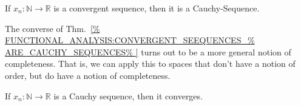 \documentclass[crop=false,class=article,oneside]{standalone}
\begin{document}
            \begin{theorem}
                \label{%
                    FUNCTIONAL_ANALYSIS:CONVERGENT_SEEQUENCES_%
                    ARE_CAUCHY_SEQUENCES%
                }
                If $x_{n}:\mathbb{N}\rightarrow\mathbb{R}$ is a 
                convergent sequence, then it is a Cauchy-Sequence.
            \end{theorem}
            The converse of Thm.~\ref{%
                FUNCTIONAL_ANALYSIS:CONVERGENT_SEEQUENCES_%
                ARE_CAUCHY_SEQUENCES%
            }
            turns out to be a more general notion of completeness.
            That is, we can apply this to spaces that don't have
            a notion of order, but do have a notion of completeness.
            \begin{theorem}
                If $x_{n}:\mathbb{N}\rightarrow\mathbb{R}$ is
                a Cauchy sequence, then it converges.
            \end{theorem}
\end{document}
